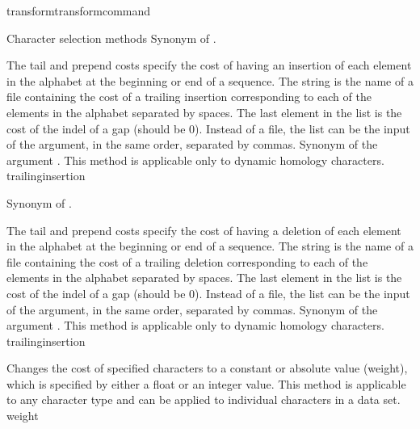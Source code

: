 \begin{command}{transform}{transformcommand}
\begin{arguments}
\begin{argumentgroup}{Character selection methods}
                {Synonym of  .}
                {}

                {The tail and prepend costs specify the cost of having an insertion of
                each element in the alphabet at the beginning or end
                of a sequence. The string is the name of a file containing the cost of
                a trailing insertion corresponding to each of the elements
                in the alphabet separated by spaces. The last element in the list is the
                cost of the indel of a gap (should be 0). Instead of a file, the list can
                be the input of the argument, in the same order, separated by commas.
                Synonym of the argument . This method is applicable 
                only to dynamic homology characters.} 
                {trailinginsertion}

                {Synonym of  .}
                {}
            
                {The tail and prepend costs specify the cost of having a deletion
                of each element in the alphabet at the beginning or end
                of a sequence. The string is the name of a file containing the cost of
                a trailing deletion corresponding to each of the elements
                in the alphabet separated by spaces. The last element in the list is the
                cost of the indel of a gap (should be 0). Instead of a file, the list can
                be the input of the argument, in the same order, separated by commas.
                Synonym of the argument . This method is applicable 
                only to dynamic homology characters.} 
                {trailinginsertion}
                
                {Changes the cost of specified characters to a constant or absolute value 
                (weight), which is specified by either a float or an integer value. 
                This method is applicable to any character type and can be applied to individual 
                characters in a data set.} 
                {weight}


\end{argumentgroup}
\end{arguments}
\end{command}
